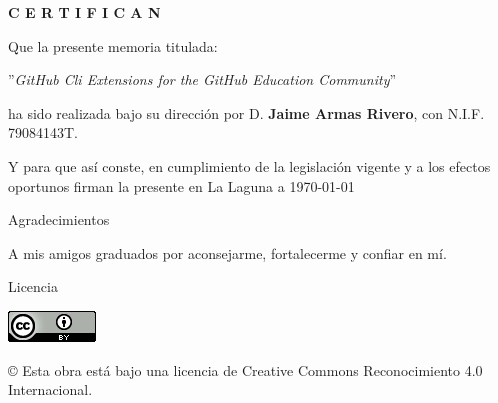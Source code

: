 \documentclass[spanish,a4paper,12pt,oneside]{extreport}
\begin{document}
\bigskip
\bigskip
{\bf C E R T I F I C A N}

\bigskip
\bigskip
Que la presente memoria titulada:

\bigskip
''{\it GitHub Cli Extensions for the GitHub
Education Community}''

\bigskip
\bigskip
\bigskip

\noindent ha sido realizada bajo su dirección por D. {\bf Jaime Armas Rivero},
con N.I.F. 79084143T.

\bigskip
\bigskip

Y para que así conste, en cumplimiento de la legislación vigente y a los efectos
oportunos firman la presente en La Laguna a \today

\newpage
\thispagestyle{empty}


\begin{LARGE}
Agradecimientos
\end{LARGE}

\hspace{3mm}

\begin{large}
A mis amigos graduados por aconsejarme, fortalecerme y confiar en mí.\\
\end{large}

\newpage
\thispagestyle{empty}

\bigskip
\begin{LARGE}
Licencia
\end{LARGE}

\begin{center}
\includegraphics[scale=1.8]{images/by_88x31}\\[5mm]
\end{center}

\begin{large}
© Esta obra está bajo una licencia de Creative Commons Reconocimiento 4.0 Internacional.
\end{large}

\newpage 
\thispagestyle{empty}
\end{document}
